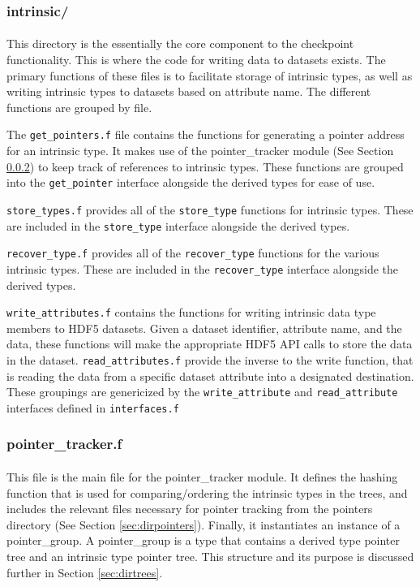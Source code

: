 \documentclass{article}
\begin{document}
\subsubsection{intrinsic/}
\label{sec:dirintrinsic}
\paragraph{}
This directory is the essentially the core component to the checkpoint functionality. This is where the code for writing data to datasets exists. The primary functions of these files is to facilitate storage of intrinsic types, as well as writing intrinsic types to datasets based on attribute name. The different functions are grouped by file.

The \texttt{get\_pointers.f} file contains the functions for generating a pointer address for an intrinsic type. It makes use of the pointer\_tracker module (See Section \ref{sec:pointertracker}) to keep track of references to intrinsic types. These functions are grouped into the \texttt{get\_pointer} interface alongside the derived types for ease of use.

\texttt{store\_types.f} provides all of the \texttt{store\_type} functions for intrinsic types. These are included in the \texttt{store\_type} interface alongside the derived types.

\texttt{recover\_type.f} provides all of the \texttt{recover\_type} functions for the various intrinsic types. These are included in the \texttt{recover\_type} interface alongside the derived types.

\texttt{write\_attributes.f} contains the functions for writing intrinsic data type members to HDF5 datasets. Given a dataset identifier, attribute name, and the data, these functions will make the appropriate HDF5 API calls to store the data in the dataset. \texttt{read\_attributes.f} provide the inverse to the write function, that is reading the data from a specific dataset attribute into a designated destination. These groupings are genericized by the \texttt{write\_attribute} and \texttt{read\_attribute} interfaces defined in \texttt{interfaces.f}

\subsubsection{pointer\_tracker.f}
\label{sec:pointertracker}
\paragraph{}
This file is the main file for the pointer\_tracker module. It defines the hashing function that is used for comparing/ordering the intrinsic types in the trees, and includes the relevant files necessary for pointer tracking from the pointers directory (See Section \ref{sec:dirpointers}). Finally, it instantiates an instance of a pointer\_group. A pointer\_group is a type that contains a derived type pointer tree and an intrinsic type pointer tree. This structure and its purpose is discussed further in Section \ref{sec:dirtrees}.
\end{document}
